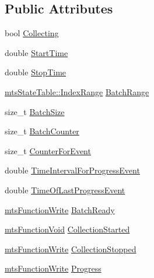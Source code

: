 \subsection*{Public Attributes}
\begin{DoxyCompactItemize}
\item 
bool \hyperlink{classmts_state_table_1_1_data_collection_info_a3cba7424d384d2c04aef689839de610f}{Collecting}
\item 
double \hyperlink{classmts_state_table_1_1_data_collection_info_a6142e6c6599148b1eadf002c9880463f}{Start\+Time}
\item 
double \hyperlink{classmts_state_table_1_1_data_collection_info_a9b815a904966196b006f88d2dc0e73b4}{Stop\+Time}
\item 
\hyperlink{classmts_state_table_1_1_index_range}{mts\+State\+Table\+::\+Index\+Range} \hyperlink{classmts_state_table_1_1_data_collection_info_aa0343b1641a1f2d77a8b3e4bfb79b17b}{Batch\+Range}
\item 
size\+\_\+t \hyperlink{classmts_state_table_1_1_data_collection_info_ac99fb26fa253839f3e56bb5102f50ed4}{Batch\+Size}
\item 
size\+\_\+t \hyperlink{classmts_state_table_1_1_data_collection_info_a30686d9c50ff6a42cff2160fec55255e}{Batch\+Counter}
\item 
size\+\_\+t \hyperlink{classmts_state_table_1_1_data_collection_info_aeefcc3cd75cdec6523e62fb6447b9aab}{Counter\+For\+Event}
\item 
double \hyperlink{classmts_state_table_1_1_data_collection_info_aa82de94c4fe55892c5be18052e5e0c0b}{Time\+Interval\+For\+Progress\+Event}
\item 
double \hyperlink{classmts_state_table_1_1_data_collection_info_a160735e608b58846356e7fc6be792832}{Time\+Of\+Last\+Progress\+Event}
\item 
\hyperlink{classmts_function_write}{mts\+Function\+Write} \hyperlink{classmts_state_table_1_1_data_collection_info_a1e655dfe05376806b0b8af648ded69e9}{Batch\+Ready}
\item 
\hyperlink{classmts_function_void}{mts\+Function\+Void} \hyperlink{classmts_state_table_1_1_data_collection_info_a95b64dcedf855f7881f4903e74101549}{Collection\+Started}
\item 
\hyperlink{classmts_function_write}{mts\+Function\+Write} \hyperlink{classmts_state_table_1_1_data_collection_info_ae4ff6ebaf115c070c00ff0686997383f}{Collection\+Stopped}
\item 
\hyperlink{classmts_function_write}{mts\+Function\+Write} \hyperlink{classmts_state_table_1_1_data_collection_info_ae4e104e80fed9252cf855f90dee1a1b9}{Progress}
\end{DoxyCompactItemize}


